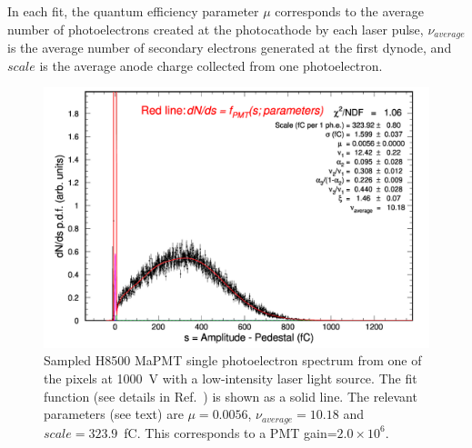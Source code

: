 \documentclass[5p,times,twocolumn]{elsarticle}
\def\MaPMT{MaPMT }
\begin{document}
In each fit, the quantum efficiency parameter $\mu$ corresponds to the average number of photoelectrons created at the photocathode by
each laser pulse, $\nu_{average}$ is the average number of secondary electrons generated at the first dynode, and $scale$ is the 
average anode charge collected from one photoelectron. 
 
\begin{figure}[bth]
	\centering
	\includegraphics[width=\linewidth]{H8500-r-W0-CA7709-w3-g064-v1000-t227-37.pdf}
	\caption{Sampled H8500 \MaPMT single photoelectron spectrum from one of the pixels at 1000~V with a low-intensity
          laser light source. The fit function (see details in Ref.~\cite{Pavel}) is shown as a solid line. 
          The relevant parameters (see text) are $\mu=0.0056$, $\nu_{average}=10.18$ and $scale=323.9$~fC. This corresponds
          to a PMT gain=$2.0 \times 10^6$.
          }
	\label{fig:SPEH8500}
\end{figure}
\end{document}
